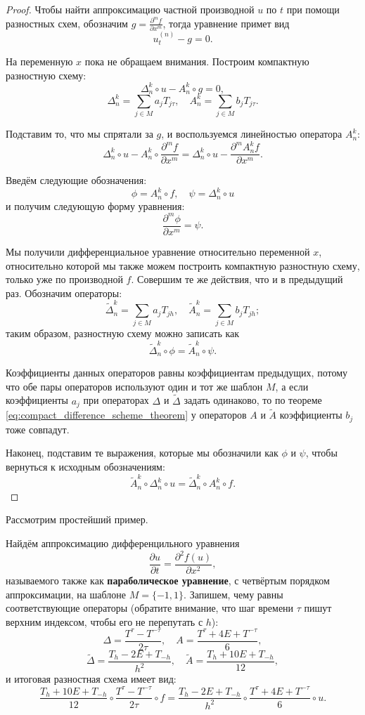 \documentclass[../main.tex]{subfile}
\begin{document}
\begin{proof}
	Чтобы найти аппроксимацию частной производной $u$ по $t$ при помощи
	разностных схем, обозначим $g=\frac{\partial^mf}{\partial x^m}$,
	тогда уравнение примет вид
	\[u^{(n)}_t-g=0.\]

	На переменную $x$ пока не обращаем внимания. Построим компактную
	разностную схему:
	\[\Delta_n^k\circ u-A_n^k\circ g=0,\]
	\[\Delta_n^k=\sum_{j\in M}a_jT_{j\tau},\quad A_n^k=\sum_{j\in M}b_j
	T_{j\tau}.\]

	Подставим то, что мы спрятали за $g$, и воспользуемся линейностью
	оператора $A_n^k$:
	\[\Delta_n^k\circ u-A_n^k\circ \frac{\partial^mf}{\partial x^m}=
	\Delta_n^k\circ u-\frac{\partial^mA_n^kf}{\partial x^m}.\]

	Введём следующие обозначения:
	\[\phi=A_n^k\circ f,\quad\psi=\Delta_n^k\circ u\]
	и получим следующую форму уравнения:
	\[\frac{\partial^m\phi}{\partial x^m}=\psi.\]

	Мы получили дифференциальное уравнение относительно переменной $x$,
	относительно которой мы также можем построить компактную разностную
	схему, только уже по производной $f$. Совершим те же действия, что
	и в предыдущий раз. Обозначим операторы:
	\[\widetilde{\Delta}_n^k=\sum_{j\in M}a_jT_{jh},\quad
	\widetilde{A}_n^k=\sum_{j\in M}b_jT_{jh};\]
	таким образом, разностную схему можно записать как
	\[\widetilde{\Delta}_n^k\circ\phi=\widetilde{A}_n^k\circ\psi.\]

	Коэффициенты данных операторов равны коэффициентам предыдущих,
	потому что обе пары операторов используют один и тот же шаблон $M$,
	а если коэффициенты $a_j$ при операторах $\Delta$ и $\widetilde{\Delta}$
	задать одинаково, то по теореме
	\eqref{eq:compact_difference_scheme_theorem} у операторов $A$ и
	$\widetilde{A}$ коэффициенты $b_j$ тоже совпадут.

	Наконец, подставим те выражения, которые мы обозначили как $\phi$ и
	$\psi$, чтобы вернуться к исходным обозначениям:
	\[\widetilde{A}_n^k\circ\Delta_n^k\circ u=\widetilde{\Delta}_n^k\circ
	A_n^k\circ f.\]
\end{proof}

Рассмотрим простейший пример.

\begin{example}
	Найдём аппроксимацию дифференцильного уравнения
	\[\frac{\partial u}{\partial t}=\frac{\partial^2f(u)}{\partial x^2},\]
	называемого также как \textbf{параболическое уравнение}, с четвёртым
	порядком аппроксимации, на шаблоне $M=\{-1,1\}$. Запишем, чему равны
	соответствующие операторы (обратите внимание, что шаг времени $\tau$
	пишут верхним индексом, чтобы его не перепутать с $h$):
	\[\Delta=\frac{T^\tau-T^{-\tau}}{2\tau},\quad A=\frac{T^\tau+4E+
	T^{-\tau}}{6},\]
	\[\widetilde{\Delta}=\frac{T_h-2E+T_{-h}}{h^2},\quad
	\widetilde{A}=\frac{T_h+10E+T_{-h}}{12},\]
	и итоговая разностная схема имеет вид:
	\[\frac{T_h+10E+T_{-h}}{12}\circ\frac{T^\tau-T^{-\tau}}{2\tau}\circ f=
	\frac{T_h-2E+T_{-h}}{h^2}\circ\frac{T^\tau+4E+T^{-\tau}}{6}\circ u.\]
\end{example}
\newpage
\end{document}
